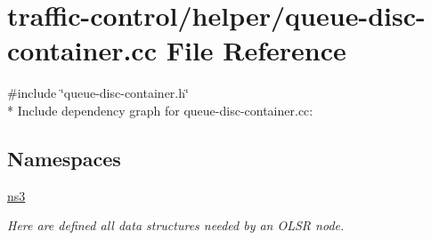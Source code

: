 \hypertarget{queue-disc-container_8cc}{}\section{traffic-\/control/helper/queue-\/disc-\/container.cc File Reference}
\label{queue-disc-container_8cc}
{\ttfamily \#include \char`\"{}queue-\/disc-\/container.\+h\char`\"{}}\\*
Include dependency graph for queue-\/disc-\/container.cc\+:
\subsection*{Namespaces}
\begin{DoxyCompactItemize}
\item 
 \hyperlink{namespacens3}{ns3}
\begin{DoxyCompactList}\small\item\em Here are defined all data structures needed by an O\+L\+SR node. \end{DoxyCompactList}\end{DoxyCompactItemize}
